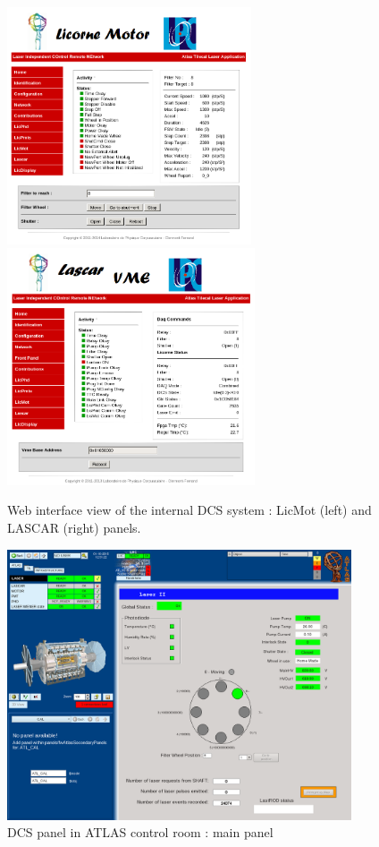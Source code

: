 \begin{appendices}
\begin{figure}[htbp]
\centering
\includegraphics[height=7cm]{figures/licorne_web3.png}
\includegraphics[height=7cm]{figures/licorne_web4.png}
\caption{Web interface view of the internal DCS system : LicMot (left) and LASCAR (right) panels.}\label{fig:licorne_webb}
\end{figure}


\newpage

\begin{figure}[htbp]
\centering
\includegraphics[height=8cm]{figures/dcs_cr_filterwheel.png}
\caption{DCS panel in ATLAS control room : main panel}\label{fig:dcs_cr_a}
\end{figure}


\end{appendices}

